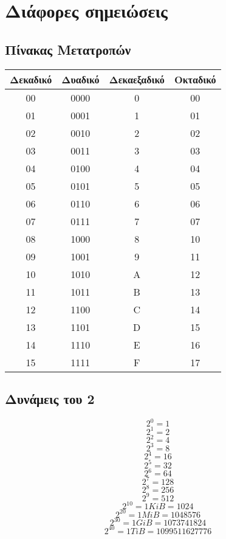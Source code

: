 \section{Διάφορες σημειώσεις}

\subsection{Πίνακας Μετατροπών}

\begin{center}
	\begin{tabular}{|c|c|c|c|}
	\hline
	Δεκαδικό & Δυαδικό & Δεκαεξαδικό & Οκταδικό \\
	\hline
	00 & 0000 & 0& 00 \\
	\hline
	01 & 0001 & 1& 01\\
	\hline
	02 & 0010 & 2& 02\\
	\hline
	03 & 0011 & 3& 03\\
	\hline
	04& 0100 & 4& 04\\
	\hline
	05& 0101 & 5& 05\\
	\hline
	06& 0110 & 6& 06\\
	\hline
	07& 0111 & 7& 07\\
	\hline
	08& 1000 & 8& 10\\
	\hline
	09& 1001 & 9& 11\\
	\hline
	10& 1010 & A& 12\\
	\hline
	11& 1011 & B& 13\\
	\hline
	12& 1100 & C& 14\\
	\hline
	13& 1101 & D& 15\\
	\hline
	14& 1110 & E& 16\\
	\hline
	15& 1111 & F& 17\\
	\hline
	\end{tabular}
\end{center}

\subsection{Δυνάμεις του 2}

$$ 2^0 = 1 $$
$$ 2^1 = 2 $$
$$ 2^2 = 4 $$
$$ 2^3 = 8 $$
$$ 2^4 = 16 $$
$$ 2^5 = 32 $$
$$ 2^6 = 64 $$
$$ 2^7 = 128 $$
$$ 2^8 = 256 $$
$$ 2^9 = 512 $$
$$ 2^{10} = 1KiB = 1024 $$
$$ 2^{20} = 1MiB = 1048576 $$
$$ 2^{30} = 1GiB = 1073741824 $$
$$ 2^{40} = 1TiB = 1099511627776 $$
